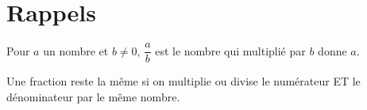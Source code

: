 \section{Rappels}

{Pour $a$ un nombre et $b\neq 0$, $\dfrac{a}{b}$ est le nombre qui multiplié par $b$ donne $a$.}


{Une fraction reste la même si on multiplie ou divise le numérateur ET le dénominateur par le même nombre.}\label{propdenomin}

